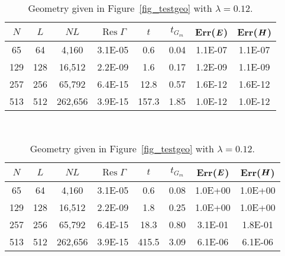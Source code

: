 \documentclass[11pt]{article}
\DeclareMathOperator{\Res}{Res}
\newcommand{\vct}{\vectorsym}
\newcommand{\bE}{\vectorsym{E}}
\newcommand{\bH}{\vct{ H}}
\numberwithin{equation}{section}
\begin{document}
{\begin{table}[!b]
\begin{center}
    \begin{subtable}{.9\linewidth}
      \centering
      \caption{Geometry given in Figure~\ref{fig_testgeo} with $\lambda =
        6.0$.}
      \label{tab_conv_pec1}
      \begin{tabular}{|c|c|c|c|c|c|c|c|} \hline
        $N$  &  $L$ & $NL$ &  $\Res\Gamma$ & $t$ & $t_{G_m}$ & Err($\bE$)
        & Err($\bH$) \\ \hline\hline
      65  &  64 & 4,160 & 3.1E-05 & 0.6 & 0.04 &1.1E-07 & 1.1E-07 \\ \hline
      129 & 128 & 16,512 & 2.2E-09 & 1.6 & 0.17  &1.2E-09 & 1.1E-09 \\ \hline
      257 & 256 & 65,792 & 6.4E-15 & 12.8 & 0.57  &1.6E-12 & 1.6E-12 \\ \hline
      513 & 512 & 262,656 & 3.9E-15 & 157.3 & 1.85  &1.0E-12 & 1.0E-12 \\ \hline
      \end{tabular}
    \end{subtable}\\
    \vspace{\baselineskip}
    \begin{subtable}{.9\linewidth}
      \centering
      \caption{Geometry given in Figure~\ref{fig_testgeo} with $\lambda =
        0.12$.}
      \label{tab_conv_pec2}
      \begin{tabular}{|c|c|c|c|c|c|c|c|} \hline
        $N$  &  $L$ & $NL$ & $\Res\Gamma $ & $t$ & $t_{G_m}$ & Err($\bE$)
        & Err($\bH$) \\ \hline\hline
        65  &  64 & 4,160 & 3.1E-05 & 0.6  & 0.08 & 1.0E+00  & 1.0E+00  \\ \hline
        129 & 128 & 16,512 & 2.2E-09 & 1.8 & 0.25 & 1.0E+00 & 1.0E+00 \\ \hline
        257 & 256 & 65,792 & 6.4E-15 & 18.3 & 0.80 & 3.1E-01 & 1.8E-01 \\ \hline
        513 & 512 & 262,656 & 3.9E-15 & 415.5 & 3.09  & 6.1E-06 & 6.1E-06 \\ \hline
      \end{tabular}
    \end{subtable}
  \end{center}
\end{table}
\clearpage
}
\end{document}
